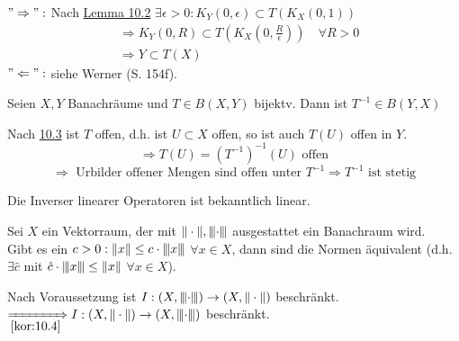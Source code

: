 \begin{beweis}
	$"\Rightarrow":$ Nach \hyperref[lemma:10.2]{Lemma 10.2} $\exists \epsilon > 0: K_{Y}(0, \epsilon) \subset T(K_{X}(0, 1)) $
	\begin{align*}
		& \Rightarrow K_{Y}(0, R) \subset T(K_{X}(0, \frac{R}{\epsilon})) \quad \forall R > 0 \\
		& \Rightarrow Y \subset T(X)
	\end{align*}
	$"\Leftarrow":$ siehe Werner (S. 154f). %
\end{beweis}


\begin{kor} \label{kor:10.4}
	Seien $X, Y$ Banachräume und $T \in B(X, Y)$ bijektv. Dann ist $T^{-1} \in B(Y, X)$	
\end{kor}

\begin{beweis}
	Nach \hyperref[satz:10.3-offeneAbbildung]{10.3} ist $T$ offen, d.h. ist $U \subset X$ offen, so ist auch $T(U)$ offen in $Y$. \\
	\[ \Rightarrow T(U) = \left( T^{-1} \right)^{-1}(U) \text{ offen} \]
	\[ \Rightarrow \text{ Urbilder offener Mengen sind offen unter } T^{-1} \Rightarrow T^{-1} \text{ ist stetig} \] 
	
	Die Inverser linearer Operatoren ist bekanntlich linear.	
\end{beweis}


\begin{kor}
	Sei $X$	ein Vektorraum, der mit $\| \cdot \|, {\left\vert\kern-0.25ex\left\vert\kern-0.25ex\left\vert\cdot\right\vert\kern-0.25ex\right\vert\kern-0.25ex\right\vert}$ ausgestattet ein Banachraum wird. \\
	Gibt es ein $c > 0: \| x \| \leq c \cdot {\left\vert\kern-0.25ex\left\vert\kern-0.25ex\left\vert x\right\vert\kern-0.25ex\right\vert\kern-0.25ex\right\vert}$ $\forall x \in X$, dann sind die Normen äquivalent (d.h. $\exists \hat{c} $ mit $\hat{c} \cdot {\left\vert\kern-0.25ex\left\vert\kern-0.25ex\left\vert x\right\vert\kern-0.25ex\right\vert\kern-0.25ex\right\vert} \leq \| x \|$ $\forall x \in X$). 
\end{kor}

\begin{beweis}
	Nach Voraussetzung ist $I : (X, {\left\vert\kern-0.25ex\left\vert\kern-0.25ex\left\vert\cdot\right\vert\kern-0.25ex\right\vert\kern-0.25ex\right\vert}) \rightarrow (X, \| \cdot \|)$ beschränkt. \\
	$\xRightarrow[\ref{kor:10.4}]{} I : (X, \| \cdot \|) \rightarrow (X, {\left\vert\kern-0.25ex\left\vert\kern-0.25ex\left\vert\cdot\right\vert\kern-0.25ex\right\vert\kern-0.25ex\right\vert})$ beschränkt.
\end{beweis}



\newpage